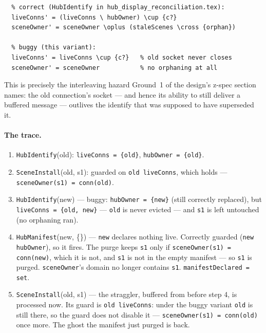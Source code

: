 \documentclass[a4paper,10pt,fleqn]{article}
\begin{document}
\begin{verbatim}
  % correct (HubIdentify in hub_display_reconciliation.tex):
  liveConns' = (liveConns \ hubOwner) \cup {c?}
  sceneOwner' = sceneOwner \oplus (staleScenes \cross {orphan})

  % buggy (this variant):
  liveConns' = liveConns \cup {c?}   % old socket never closes
  sceneOwner' = sceneOwner           % no orphaning at all
\end{verbatim}

This is precisely the interleaving hazard Ground~1 of the design's z-spec
section names: the old connection's socket --- and hence its ability to
still deliver a buffered message --- outlives the identify that was
supposed to have superseded it.

\paragraph{The trace.}
\begin{enumerate}
  \item \texttt{HubIdentify}(old): \texttt{liveConns = \{old\}},
    \texttt{hubOwner = \{old\}}.
  \item \texttt{SceneInstall}(old, s1): guarded on \texttt{old \in
    liveConns}, which holds --- \texttt{sceneOwner(s1) = conn(old)}.
  \item \texttt{HubIdentify}(new) --- buggy: \texttt{hubOwner = \{new\}}
    (still correctly replaced), but \texttt{liveConns = \{old, new\}} ---
    \texttt{old} is never evicted --- and \texttt{s1} is left untouched
    (no orphaning ran).
  \item \texttt{HubManifest}(new, \{\}) --- \texttt{new} declares nothing
    live.  Correctly guarded (\texttt{new \in hubOwner}), so it fires.
    The purge keeps \texttt{s1} only if \texttt{sceneOwner(s1) =
    conn(new)}, which it is not, and \texttt{s1} is not in the empty
    manifest --- so \texttt{s1} is purged.  \texttt{sceneOwner}'s domain
    no longer contains \texttt{s1}.  \texttt{manifestDeclared = set}.
  \item \texttt{SceneInstall}(old, s1) --- the straggler, buffered from
    before step 4, is processed now.  Its guard is \texttt{old \in
    liveConns}: under the buggy variant \texttt{old} is still there, so
    the guard does not disable it --- \texttt{sceneOwner(s1) = conn(old)}
    once more.  The ghost the manifest just purged is back.
\end{enumerate}
\end{document}
